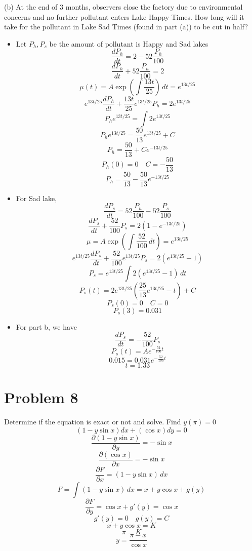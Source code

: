 \documentclass[hidelinks]{article}
\begin{document}
(b) At the end of 3 months, observers close the factory due to environmental concerns and no further pollutant enters Lake Happy Times. How long will it take for the pollutant in Lake Sad Times (found in part (a)) to be cut in half?
\begin{itemize}
    \item[ ] Let $P_h, P_s$ be the amount of pollutant is Happy and Sad lakes
    \[
        \frac{dP_h}{dt} = 2 - 52\frac{P_h}{100}
    \]
    \[
        \frac{dP_h}{dt}  +  52\frac{P_h}{100}= 2 
    \]
    \[
        \mu(t) = A\exp(\int \frac{13t}{25})\, dt  = e^{13t/25} 
    \]
    \[
    e^{13t/25}\frac{dP_h}{dt} + \frac{13t}{25}e^{13t/25}P_h = 2e^{13t/25}
    \]
    \[
        P_h e^{13t/25} = \int 2e^{13t/25}
    \]
    \[
        P_h  e^{13t/25}= \frac{50}{13}e^{13t/25} + C
    \]
    \[
        P_h =   \frac{50}{13} + Ce^{-13t/25}
    \]
    \[
        P_h(0) = 0 \quad C = -\frac{50}{13}
    \]
    \[
        P_h   = \frac{50}{13} - \frac{50}{13}e^{-13t/25}
    \]
    \item[ ] For Sad lake,
    \[
        \frac{dP_s}{dt} = 52\frac{P_h}{100} - 52\frac{P_s}{100}
    \]
    \[
        \frac{dP_s}{dt} +  \frac{52}{100}P_s= 2(1 - e^{-13t/25}) 
    \]
    \[
        \mu = A\exp(\int \frac{52}{100} \, dt) = e^{13t/25}
    \]
    \[
        e^{13t/25}\frac{dP_s}{dt} + \frac{52}{100}e^{13t/25}P_s = 2(e^{13t/25} - 1)
    \]
    \[
        P_s = e^{13t/25}\int 2(e^{13t/25} - 1) \, dt 
    \]
    \[
        P_s(t) = 2e^{13t/25}(\frac{25}{13}e^{13t/25} - t) + C
    \]
    \[
        P_s(0) = 0 \quad C = 0
    \]
    \[
        P_s(3) = 0.031 
    \]
    \item[ ] For part b, we have
    \[
    \frac{dP_s}{dt} = -\frac{52}{100}P_s
    \]
    \[
    P_s(t) = Ae^{-\frac{52}{100}t} 
    \]
    \[
        0.015 = 0.031e^{-\frac{52}{100}t}
    \]
    \[
        t = 1.33
    \]
\end{itemize}
\newpage
\section*{Problem 8}
Determine if the equation is exact or not and solve. Find $y(\pi) = 0$
\[
    (1-y \sin x)dx + (\cos x) dy = 0
\]
\[
    \frac{\partial (1-y \sin x)}{\partial y} = -\sin x
\]
\[
    \frac{\partial (\cos x)}{\partial x} = -\sin x
\]
\[
    \frac{\partial F}{\partial x} = (1- y \sin x) \, dx 
\]
\[
    F = \int (1 - y \sin x) \, dx = x + y \cos x + g(y)
\]
\[
    \frac{\partial F}{\partial y} = \cos x + g'(y) = \cos x
\]
\[
    g'(y) = 0 \quad g(y) = C
\]
\[
    x + y \cos x = K
\]
\[
    \pi = K
\]
\[
    y = \frac{\pi -x}{\cos x}
\]
\newpage
\end{document}

